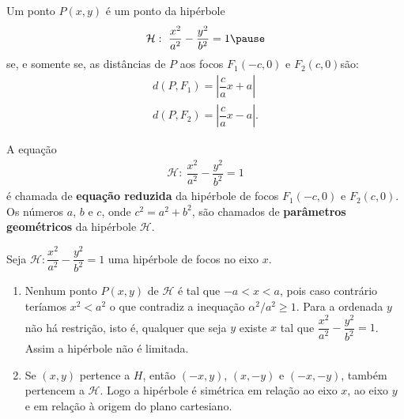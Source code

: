 \documentclass{beamer}
\begin{document}
\begin{frame}
    \begin{proposicao}
        Um ponto $P(x, y)$ \pause é um ponto da hipérbole\pause
        \[
            \mathcal{H}:\ \dfrac{x^2}{a^2} - \dfrac{y^2}{b^2} = 1\pause
        \]
        se, e somente se, \pause as distâncias de $P$ aos focos $F_1(-c, 0)$ e $F_2(c, 0)$\pause são:\pause
        \begin{align*}
            d(P,F_1) = \left|\dfrac{c}{a}x + a\right| \\
            d(P,F_2) = \left|\dfrac{c}{a}x - a\right|.
        \end{align*}
    \end{proposicao}
\end{frame}

\begin{frame}
    \begin{definicao}
        A equação\pause
        \begin{align}\label{equacao_reduzida_da_hiperbole}
            \mathcal{H}:\ \dfrac{x^2}{a^2} - \dfrac{y^2}{b^2} = 1
        \end{align}\pause
        é chamada de \pause \textbf{equação reduzida} da hipérbole de focos $F_1(-c, 0)$ \pause e $F_2(c, 0)$. \pause Os números $a$, \pause $b$ \pause e $c$, \pause onde $c^2 = a^2 + b^2$, \pause são
        chamados de \pause \textbf{parâmetros geométricos} da hipérbole $\mathcal{H}$.
    \end{definicao}
\end{frame}

\begin{frame}
    \begin{observacao}
        Seja $\mathcal{H} : \dfrac{x^2}{a^2} - \dfrac{y^2}{b^2} = 1$ \pause uma hipérbole de focos no eixo $x$.\pause
        \begin{enumerate}[label=({\arabic*})]
            \item Nenhum ponto $P(x,y)$ de $\mathcal{H}$ \pause é tal que $-a < x < a$, \pause pois caso contrário teríamos $x^2 < a^2$ \pause o que
                  contradiz a inequação $\alpha^2/a^2 \ge 1$. \pause Para a ordenada $y$ não há restrição, \pause isto é, \pause qualquer que seja $y$ \pause
                  existe $x$ tal que $\dfrac{x^2}{a^2} - \dfrac{y^2}{b^2} = 1$. \pause Assim a hipérbole não é limitada.\pause
            \item Se $(x,y)$ pertence a $H$, \pause então $(-x,y)$, \pause $(x,-y)$ \pause e $(-x,-y)$, \pause também pertencem a $\mathcal{H}$. \pause
                  Logo a hipérbole é simétrica em relação ao eixo $x$, \pause ao eixo $y$ \pause e em relação à origem do plano cartesiano.
                  \seti
        \end{enumerate}
    \end{observacao}
\end{frame}
\end{document}
